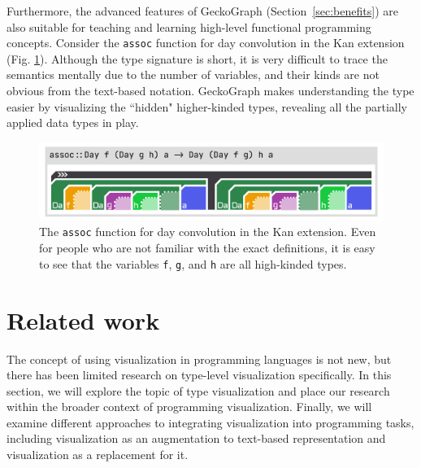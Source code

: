 Furthermore, the advanced features of GeckoGraph (Section~\ref{sec:benefits}) are also suitable for teaching and learning high-level functional programming concepts. Consider the \texttt{assoc} function for day convolution \cite{Day1970-kb} in the Kan extension (Fig. \ref{fig:assoc}). Although the type signature is short, it is very difficult to trace the semantics mentally due to the number of variables, and their kinds are not obvious from the text-based notation. GeckoGraph makes understanding the type easier by visualizing the ``hidden" higher-kinded types, revealing all the partially applied data types in play.

\begin{figure}[hbt]
  \includegraphics[width=\linewidth]{figures/assoc}
  \caption[The \texttt{assoc} function for day convolution \cite{Day1970-kb} in the Kan extension depicted in GeckoGraph]{\label{fig:assoc} The \texttt{assoc} function for day convolution \cite{Day1970-kb} in the Kan extension. Even for people who are not familiar with the exact definitions, it is easy to see that the variables \texttt{f},  \texttt{g}, and \texttt{h} are all high-kinded types.}
\end{figure}







\section{Related work}
The concept of using visualization in programming languages is not new, but there has been limited research on type-level visualization specifically. In this section, we will explore the topic of type visualization and place our research within the broader context of programming visualization. Finally, we will examine different approaches to integrating visualization into programming tasks, including visualization as an augmentation to text-based representation and visualization as a replacement for it.

